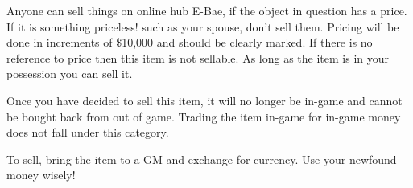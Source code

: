 \documentclass[green]{LRSguildcamp1}
\begin{document}
\name{\gSellingThing{}}
 
Anyone can sell things on online hub E-Bae, if the object in question has a price. If it is something priceless! such as your spouse, don't sell them. Pricing will be done in increments of \$10,000 and should be clearly marked. If there is no reference to price then this item is not sellable. As long as the item is in your possession you can sell it.  

Once you have decided to sell this item, it will no longer be in-game and cannot be bought back from out of game. Trading the item in-game for in-game money does not fall under this category.  

To sell, bring the item to a GM and exchange for currency. Use your newfound money wisely! 
\end{document}
